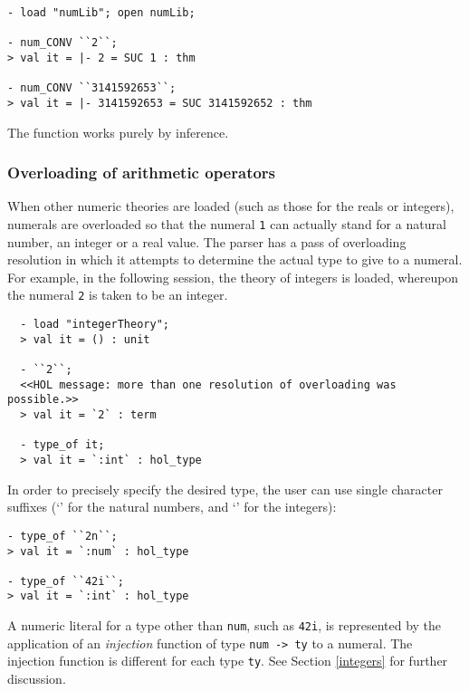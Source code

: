 \setcounter{sessioncount}{0}
\begin{session}
\begin{verbatim}
- load "numLib"; open numLib;

- num_CONV ``2``;
> val it = |- 2 = SUC 1 : thm

- num_CONV ``3141592653``;
> val it = |- 3141592653 = SUC 3141592652 : thm
\end{verbatim}
\end{session}

\noindent The  function works purely by inference.

\subsubsection{Overloading of arithmetic operators}
\label{arith-overloading}

When other numeric theories are loaded (such as those for the reals or
integers), numerals are overloaded so that the numeral {\small\verb+1+} can
actually stand for a natural number, an integer or a real value. The
parser has a pass of overloading resolution in which it attempts to
determine the actual type to give to a numeral. For example, in the
following session, the theory of integers is loaded, whereupon the
numeral \verb+2+ is taken to be an integer.
%
\begin{session}
{\small
\begin{verbatim}
  - load "integerTheory";
  > val it = () : unit

  - ``2``;
  <<HOL message: more than one resolution of overloading was possible.>>
  > val it = `2` : term

  - type_of it;
  > val it = `:int` : hol_type
\end{verbatim}}
\end{session}

 In order to precisely specify the desired type, the user can use single
character suffixes (`' for the natural numbers, and `' for
the integers):
\begin{session}
{\small
\begin{verbatim}
- type_of ``2n``;
> val it = `:num` : hol_type

- type_of ``42i``;
> val it = `:int` : hol_type
\end{verbatim}}
\end{session}

A numeric literal for a \HOL{} type other than \verb+num+, such as
\verb+42i+,  is represented by the application of an
\emph{injection} function of type {\small\verb+num -> ty+} to a
numeral. The injection function is different for each type
{\small\verb+ty+}. See Section \ref{integers} for further discussion.

